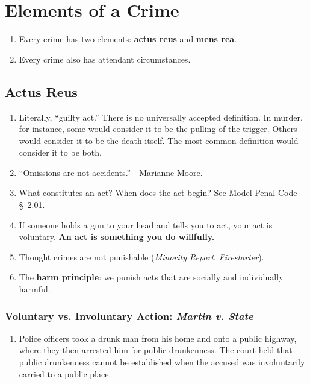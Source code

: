 \section{Elements of a Crime}

\begin{enumerate}
    \item Every crime has two elements: \textbf{actus reus} and \textbf{mens 
    rea}.
    \item Every crime also has attendant circumstances.
\end{enumerate}

\subsection{Actus Reus}

\begin{enumerate}
    \item Literally, ``guilty act.'' There is no universally accepted 
    definition. In murder, for instance, some would consider it to be the 
    pulling of the trigger. Others would consider it to be the death itself.  
    The most common definition would consider it to be both.
    \item ``Omissions are not accidents.''---Marianne Moore.
    \item What constitutes an act? When does the act begin? See Model Penal 
    Code \S\ 2.01.
    \item If someone holds a gun to your head and tells you to act, your act 
    is voluntary. \textbf{An act is something you do willfully.}
    \item Thought crimes are not punishable (\emph{Minority Report}, 
    \emph{Firestarter}).
    \item The \textbf{harm principle}: we punish acts that are socially and 
    individually harmful.
\end{enumerate}

\subsubsection{Voluntary vs. Involuntary Action: \emph{Martin v. State}}

\begin{enumerate}
    \item Police officers took a drunk man from his home and onto a public 
    highway, where they then arrested him for public drunkenness. The court 
    held that public drunkenness cannot be established when the accused was 
    involuntarily carried to a public place.
\end{enumerate}

